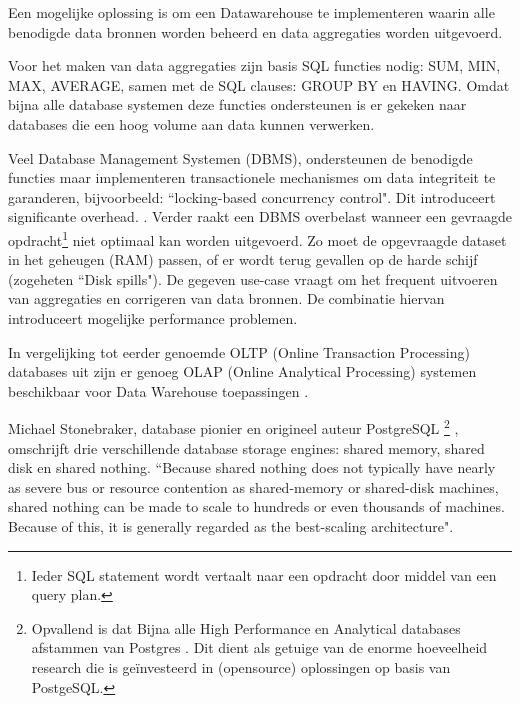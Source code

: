 Een mogelijke oplossing is om een Datawarehouse te implementeren waarin alle benodigde data bronnen worden beheerd en data aggregaties worden uitgevoerd.

Voor het maken van data aggregaties zijn basis SQL functies nodig: SUM, MIN, MAX, AVERAGE, samen met de SQL clauses: GROUP BY en HAVING. \parencite{data-mining}
Omdat bijna alle database systemen deze functies ondersteunen is er gekeken naar databases die een hoog volume aan data kunnen verwerken.

Veel Database Management Systemen (DBMS), ondersteunen de benodigde functies maar implementeren transactionele mechanismes om data integriteit te garanderen, bijvoorbeeld: ``locking-based concurrency control". Dit introduceert significante overhead. \parencite{harizopoulos2008oltp}. Verder raakt een DBMS overbelast wanneer een gevraagde opdracht\footnote{ Ieder SQL statement wordt vertaalt naar een opdracht door middel van een query plan.} niet optimaal kan worden uitgevoerd. Zo moet de opgevraagde dataset in het geheugen (RAM) passen, of er wordt terug gevallen op de harde schijf (zogeheten ``Disk spills"). De gegeven use-case vraagt om het frequent uitvoeren van aggregaties en corrigeren van data bronnen. De combinatie hiervan introduceert mogelijke performance problemen. \parencite{kersten2011researcher}


In vergelijking tot eerder genoemde OLTP (Online Transaction Processing) databases uit \textcite{kersten2011researcher} zijn er genoeg OLAP (Online Analytical Processing) systemen beschikbaar voor Data Warehouse toepassingen \parencite{data-mining}.


Michael Stonebraker, database pionier en origineel auteur PostgreSQL
\footnote{
 Opvallend is dat Bijna alle High Performance en Analytical databases afstammen van Postgres \parencite{postgresforks}. Dit dient als getuige van de enorme hoeveelheid research die is geïnvesteerd in (opensource) oplossingen op basis van PostgeSQL.
}
, omschrijft drie verschillende database storage engines: shared memory, shared disk en shared nothing. ``Because shared nothing does not typically have nearly as severe bus or resource contention as shared-memory or shared-disk machines, shared nothing can be made to scale to hundreds or even thousands of machines. Because of this, it is generally regarded as the best-scaling architecture". \parencite{dewitt2006build}


